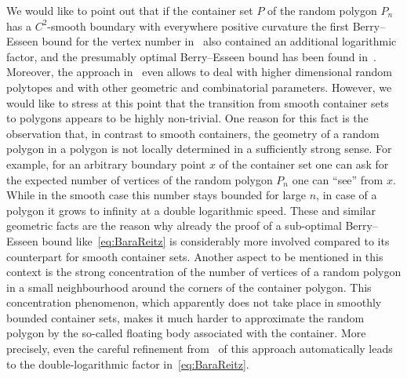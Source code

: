 \documentclass[10pt]{amsart}
\theoremstyle{definition}\newtheorem{defi}[theo]{Definition}\newtheorem{rema}[theo]{Remark}\newtheorem{exam}[theo]{Example}\newtheorem{exem}[theo]{Example}\newtheorem{nota}[theo]{Notation}
\begin{document}
We would like to point out that if the container set $P$ of the random polygon $P_n$ has a $C^2$-smooth boundary with everywhere positive curvature the first Berry--Esseen bound for the vertex number in~\cite{Reitz05} also contained an additional logarithmic factor, and the presumably optimal Berry--Esseen bound has been found in~\cite[Theorem~3.5]{LachSchulteYukich}. Moreover, the approach in~\cite{LachSchulteYukich} even allows to deal with higher dimensional random polytopes and with other geometric and combinatorial parameters. However, we would like to stress at this point that the transition from smooth container sets to polygons appears to be highly non-trivial. One reason for this fact is the observation that, in contrast to smooth containers, the geometry of a random polygon in a polygon is not locally determined in a sufficiently strong sense. For example, for an arbitrary boundary point $x$ of the container set one can ask for the expected number of vertices of the random polygon $P_n$ one can ``see'' from $x$. While in the smooth case this number stays bounded for large $n$, in case of a polygon it grows to infinity at a double logarithmic speed. These and similar geometric facts are the reason why already the proof of a sub-optimal Berry--Esseen bound like~\eqref{eq:BaraReitz} is considerably more involved compared to its counterpart for smooth container sets. Another aspect to be mentioned in this context is the strong concentration of the number of vertices of a random polygon in a small neighbourhood around the corners of the container polygon. This concentration phenomenon, which apparently does not take place in smoothly bounded container sets, makes it much harder to approximate the random polygon by the so-called floating body associated with the container. More precisely, even the careful refinement from~\cite{BR10} of this approach automatically leads to the double-logarithmic factor in~\eqref{eq:BaraReitz}.
\end{document}
